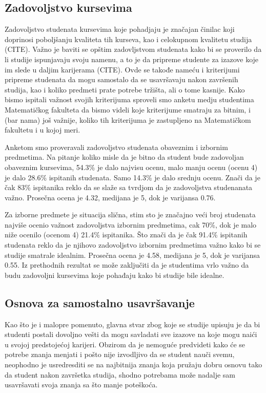 \documentclass[a4paper]{article}
\begin{document}
\subsection{Zadovoljstvo kursevima}
\label{subsec:zadovoljstvo_kursevima}

Zadovoljstvo studenata kursevima koje pohadjaju je značajan činilac koji doprinosi poboljšanju kvaliteta tih kurseva, kao i celokupnom kvalitetu studija (CITE). Važno je baviti se opštim zadovljstvom studenata kako bi se proverilo da li studije ispunjavaju svoju namenu, a to je da pripreme studente za izazove koje im slede u daljim karijerama (CITE). Ovde se takođe nameću i kriterijumi pripreme studenata da mogu samostalo da se usavršavaju nakon završenih studija, kao i koliko predmeti prate potrebe tržišta, ali o tome kasnije.
Kako bismo ispitali važnost svojih kriterijuma sproveli smo anketu medju studentima Matematičkog fakulteta da bismo videli koje kriterijume smatraju za bitnim, i (bar nama) još važnije, koliko tih kriterijuma je zastupljeno na Matematičkom fakultetu i u kojoj meri.

Anketom smo proveravali zadovoljstvo studenata obaveznim i izbornim predmetima. Na pitanje koliko misle da je bitno da student bude zadovoljan obaveznim kursevima, 54.3\% je dalo najvisu ocenu, malo manju ocenu (ocenu 4) je dalo 28.6\% ispitanih studenata. Samo  14.3\% je dalo srednju ocenu. Znači da je čak 83\% ispitanika reklo da se slaže sa tvrdjom da je zadovoljstva studenanata važno. Prosečna ocena je 4.32, medijana je 5, dok je varijansa 0.76.

Za izborne predmete je situacija slična, stim sto je značajno veći broj studenata najviše ocenio važnost zadovoljstva izbornim predmetima, cak 70\%, dok je malo niže ocenilo (ocenom 4) 21.4\% ispitanika. Što znači da je čak 91.4\% ispitanih studenata reklo da je njihovo zadovoljstvo izbornim predmetima važno kako bi se studije smatrale idealnim. Prosečna ocena je 4.58, medijana je 5, dok je varijansa 0.55. Iz prethodnih rezultat se može zaključiti da je studentima vrlo važno da budu zadovoljni kursevima koje pohađaju kako bi studije bile idealne.


\subsection{Osnova za samostalno usavršavanje}
\label{subsec:samostalno_usavršavanje}
Kao što je i malopre pomenuto, glavna stvar zbog koje se studije upisuju je da bi studenti postali dovoljno vešti da mogu savladati sve izazove na koje mogu naići u svojoj predstojećoj karijeri. Obzirom da je nemoguće predvideti kako će se potrebe znanja menjati i pošto nije izvodljivo da se student nauči svemu, neophodno je usredresditi se na najbitnija znanja koja pružaju dobru osnovu tako da student nakon završetka studija, shodno potrebama može nadalje sam usavršavati svoja znanja sa što manje poteškoća.
\end{document}
